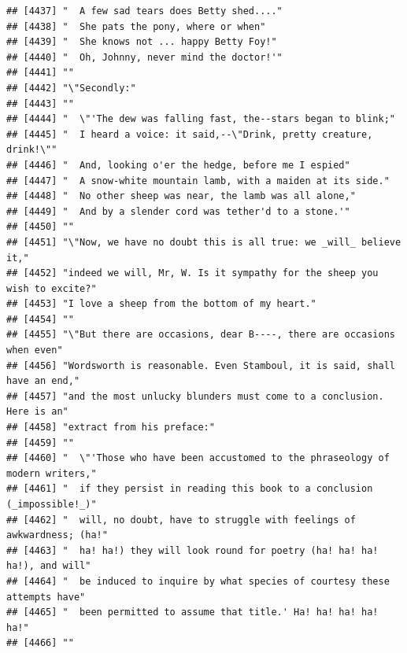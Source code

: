 \documentclass{article}\usepackage[]{graphicx}\usepackage[]{color}
\makeatletter
\newenvironment{kframe}{%
 \def\at@end@of@kframe{}%
 \ifinner\ifhmode%
  \def\at@end@of@kframe{\end{minipage}}%
  \begin{minipage}{\columnwidth}%
 \fi\fi%
 \def\FrameCommand##1{\hskip\@totalleftmargin \hskip-\fboxsep
 \colorbox{shadecolor}{##1}\hskip-\fboxsep
     \hskip-\linewidth \hskip-\@totalleftmargin \hskip\columnwidth}%
 \MakeFramed {\advance\hsize-\width
   \@totalleftmargin\z@ \linewidth\hsize
   \@setminipage}}%
 {\par\unskip\endMakeFramed%
 \at@end@of@kframe}
\newenvironment{knitrout}{}{} %
\makeatother
\begin{document}
\begin{knitrout}
\begin{kframe}
\begin{verbatim}
## [4437] "  A few sad tears does Betty shed...."                                       
## [4438] "  She pats the pony, where or when"                                          
## [4439] "  She knows not ... happy Betty Foy!"                                        
## [4440] "  Oh, Johnny, never mind the doctor!'"                                       
## [4441] ""                                                                            
## [4442] "\"Secondly:"                                                                 
## [4443] ""                                                                            
## [4444] "  \"'The dew was falling fast, the--stars began to blink;"                   
## [4445] "  I heard a voice: it said,--\"Drink, pretty creature, drink!\""             
## [4446] "  And, looking o'er the hedge, before me I espied"                           
## [4447] "  A snow-white mountain lamb, with a maiden at its side."                    
## [4448] "  No other sheep was near, the lamb was all alone,"                          
## [4449] "  And by a slender cord was tether'd to a stone.'"                           
## [4450] ""                                                                            
## [4451] "\"Now, we have no doubt this is all true: we _will_ believe it,"             
## [4452] "indeed we will, Mr, W. Is it sympathy for the sheep you wish to excite?"     
## [4453] "I love a sheep from the bottom of my heart."                                 
## [4454] ""                                                                            
## [4455] "\"But there are occasions, dear B----, there are occasions when even"        
## [4456] "Wordsworth is reasonable. Even Stamboul, it is said, shall have an end,"     
## [4457] "and the most unlucky blunders must come to a conclusion. Here is an"         
## [4458] "extract from his preface:"                                                   
## [4459] ""                                                                            
## [4460] "  \"'Those who have been accustomed to the phraseology of modern writers,"   
## [4461] "  if they persist in reading this book to a conclusion (_impossible!_)"      
## [4462] "  will, no doubt, have to struggle with feelings of awkwardness; (ha!"       
## [4463] "  ha! ha!) they will look round for poetry (ha! ha! ha! ha!), and will"      
## [4464] "  be induced to inquire by what species of courtesy these attempts have"     
## [4465] "  been permitted to assume that title.' Ha! ha! ha! ha! ha!"                 
## [4466] ""                                                                            

\end{verbatim}
\end{kframe}
\end{knitrout}
\end{document}
